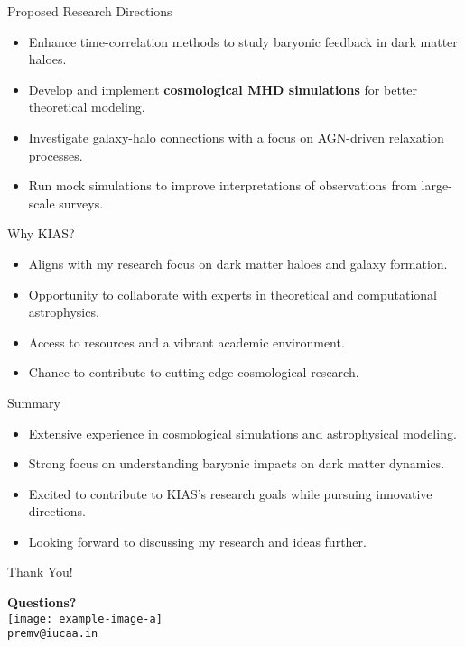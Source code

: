 \documentclass{beamer}
\begin{document}
\begin{frame}{Proposed Research Directions}
    \begin{itemize}
        \item Enhance time-correlation methods to study baryonic feedback in dark matter haloes.
        \item Develop and implement \textbf{cosmological MHD simulations} for better theoretical modeling.
        \item Investigate galaxy-halo connections with a focus on AGN-driven relaxation processes.
        \item Run mock simulations to improve interpretations of observations from large-scale surveys.
    \end{itemize}
\end{frame}

\begin{frame}{Why KIAS?}
    \begin{itemize}
        \item Aligns with my research focus on dark matter haloes and galaxy formation.
        \item Opportunity to collaborate with experts in theoretical and computational astrophysics.
        \item Access to resources and a vibrant academic environment.
        \item Chance to contribute to cutting-edge cosmological research.
    \end{itemize}
\end{frame}

\begin{frame}{Summary}
    \begin{itemize}
        \item Extensive experience in cosmological simulations and astrophysical modeling.
        \item Strong focus on understanding baryonic impacts on dark matter dynamics.
        \item Excited to contribute to KIAS's research goals while pursuing innovative directions.
        \item Looking forward to discussing my research and ideas further.
    \end{itemize}
\end{frame}

\begin{frame}{Thank You!}
    \begin{center}
        \textbf{Questions?}\\[1em]
        \texttt{[image: example-image-a]} \\
        \texttt{premv@iucaa.in}
    \end{center}
\end{frame}
\end{document}
